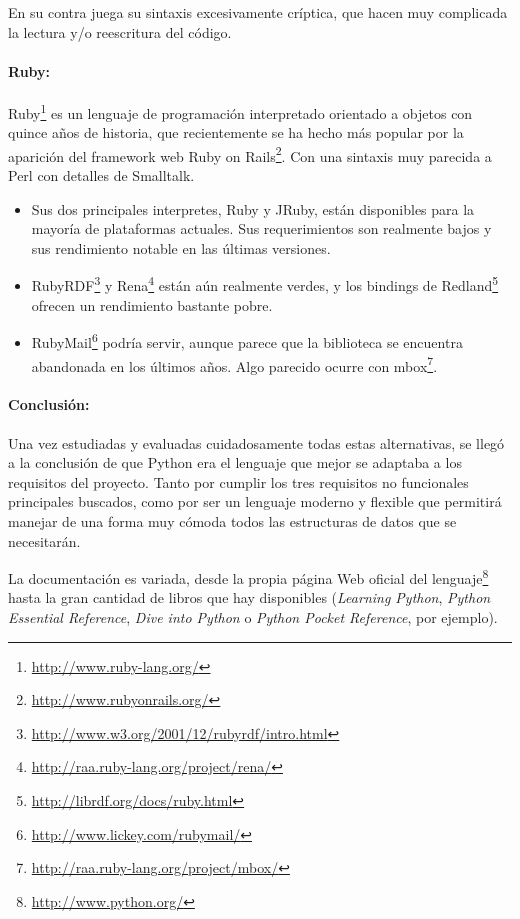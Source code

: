 En su contra juega su sintaxis excesivamente críptica, que hacen muy complicada
la lectura y/o reescritura del código.

\paragraph{Ruby:}Ruby\footnote{\url{http://www.ruby-lang.org/}} es un lenguaje de 
programación interpretado orientado a objetos con quince años de historia, que 
recientemente se ha hecho más popular por la aparición del framework web 
Ruby on Rails\footnote{\url{http://www.rubyonrails.org/}}. Con una sintaxis muy
parecida a Perl con detalles de Smalltalk.

\begin{itemize}
  \item Sus dos principales interpretes, Ruby y JRuby, están disponibles para la
	mayoría de plataformas actuales. Sus requerimientos son realmente bajos y
	sus rendimiento notable en las últimas versiones.
  \item RubyRDF\footnote{\url{http://www.w3.org/2001/12/rubyrdf/intro.html}} y 
	Rena\footnote{\url{http://raa.ruby-lang.org/project/rena/}} están aún
	realmente verdes, y los bindings de Redland\footnote{\url{http://librdf.org/docs/ruby.html}} 
	ofrecen un rendimiento bastante pobre.
  \item RubyMail\footnote{\url{http://www.lickey.com/rubymail/}} podría servir,
	aunque parece que la biblioteca se encuentra abandonada en los últimos años. 
	Algo parecido ocurre con mbox\footnote{\url{http://raa.ruby-lang.org/project/mbox/}}.
\end{itemize}

\paragraph{Conclusión:}Una vez estudiadas y evaluadas cuidadosamente todas estas 
alternativas, se llegó a la conclusión de que Python era el lenguaje que mejor se 
adaptaba a los requisitos del proyecto. Tanto por cumplir los tres requisitos 
no funcionales principales buscados, como por ser un lenguaje moderno y flexible 
que permitirá manejar de una forma muy cómoda todos las estructuras de datos que se
necesitarán.

La documentación es variada, desde la propia página Web oficial del 
lenguaje\footnote{\url{http://www.python.org/}} hasta la gran cantidad de libros
que hay disponibles (\emph{Learning Python}\cite{LearningPython},
\emph{Python Essential Reference}\cite{PythonEssential}, 
\emph{Dive into Python}\cite{DivePython} o \emph{Python Pocket Reference}\cite{PythonPocket},
por ejemplo).
